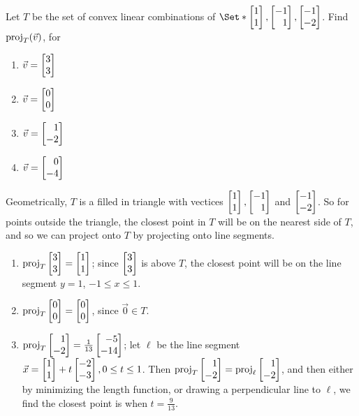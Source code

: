 \begin{exercises}
\begin{problist}
		\prob Let $T$ be the set of convex linear combinations of $\Set*{\mat{1\\1}, \mat{-1\\1},\mat{-1\\-2}}$. Find $\operatorname{proj}_T(\vec v)$, for 
\begin{enumerate}
	\item $\vec v = \mat {3\\3}$
	\item $\vec v = \mat {0\\0}$
	\item $\vec v = \mat {1\\-2}$
	\item $\vec v = \mat {0\\-4}$
\end{enumerate}
		\begin{solution}
Geometrically, $T$ is a filled in triangle with vectices $\mat{1\\1},
\mat{-1\\1}$ and $\mat{-1\\-2}$. So for points outside the triangle,
the closest point in $T$ will be on the nearest side of $T$, and so we can project
			onto $T$ by projecting onto line segments.

			\begin{enumerate}
				\item $\Proj_T \mat {3\\3} = \mat {1\\1}$; since $\mat {3\\3}$ is above $T$, the closest point will be on the line segment $y=1$, $-1\leq x \leq 1$.

\item $\Proj_T \mat {0\\0} = \mat {0\\0}$, since $\vec 0\in T$.

\item $\Proj_T \mat {1\\-2} = \frac{1}{13}\mat {-5\\-14}$; let $\ell$ be the line segment $\vec x= \mat {1\\1}+t\mat{-2\\-3}, 0\leq t \leq 1$. Then $\Proj_T \mat {1\\-2} = \Proj_\ell \mat{1\\-2}$, and then either by minimizing the length function, or drawing a perpendicular line to $\ell$, we find the closest point is when $t=\frac {9}{13}$. 


\end{enumerate}
\end{solution}
\end{problist}
\end{exercises}
